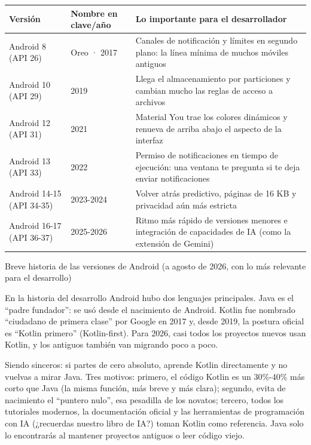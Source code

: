 \begin{center}
\begin{tabularx}{\linewidth}{|X|X|X|}
\hline
\textbf{Versión} & \textbf{Nombre en clave/año} & \textbf{Lo importante para el desarrollador} \tabularnewline
\hline
Android 8 (API 26) & Oreo · 2017 & Canales de notificación y límites en segundo plano: la línea mínima de muchos móviles antiguos \tabularnewline
Android 10 (API 29) & 2019 & Llega el almacenamiento por particiones y cambian mucho las reglas de acceso a archivos \tabularnewline
Android 12 (API 31) & 2021 & Material You trae los colores dinámicos y renueva de arriba abajo el aspecto de la interfaz \tabularnewline
Android 13 (API 33) & 2022 & Permiso de notificaciones en tiempo de ejecución: una ventana te pregunta si te deja enviar notificaciones \tabularnewline
Android 14-15 (API 34-35) & 2023-2024 & Volver atrás predictivo, páginas de 16 KB y privacidad aún más estricta \tabularnewline
Android 16-17 (API 36-37) & 2025-2026 & Ritmo más rápido de versiones menores e integración de capacidades de IA (como la extensión de Gemini) \tabularnewline
\hline
\end{tabularx}
\end{center}

\begin{center}\small\color{gray}Breve historia de las versiones de Android (a agosto de 2026, con lo más relevante para el desarrollo)\end{center}


En la historia del desarrollo Android hubo dos lenguajes principales. Java es el “padre fundador”: se usó desde el nacimiento de Android. Kotlin fue nombrado “ciudadano de primera clase” por Google en 2017 y, desde 2019, la postura oficial es “Kotlin primero” (Kotlin-first). Para 2026, casi todos los proyectos nuevos usan Kotlin, y los antiguos también van migrando poco a poco.

Siendo sinceros: si partes de cero absoluto, aprende Kotlin directamente y no vuelvas a mirar Java. Tres motivos: primero, el código Kotlin es un 30\%-40\% más corto que Java (la misma función, más breve y más clara); segundo, evita de nacimiento el “puntero nulo”, esa pesadilla de los novatos; tercero, todos los tutoriales modernos, la documentación oficial y las herramientas de programación con IA (¿recuerdas nuestro libro de IA?) toman Kotlin como referencia. Java solo lo encontrarás al mantener proyectos antiguos o leer código viejo.


